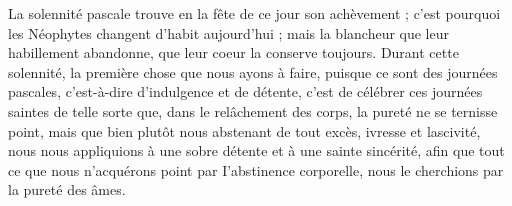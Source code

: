  La solennité pascale trouve en la fête de ce jour son achèvement ; c’est pourquoi les Néophytes changent d’habit aujourd’hui ; mais la blancheur que leur habillement abandonne, que leur coeur la conserve toujours. Durant cette solennité, la première chose que nous ayons à faire, puisque ce sont des journées pascales, c’est-à-dire d’indulgence et de détente, c’est de célébrer ces journées saintes de telle sorte que, dans le relâchement des corps, la pureté ne se ternisse point, mais que bien plutôt nous abstenant de tout excès, ivresse et lascivité, nous nous appliquions à une sobre détente et à une sainte sincérité, afin que tout ce que nous n’acquérons point par I’abstinence corporelle, nous le cherchions par la pureté des âmes.